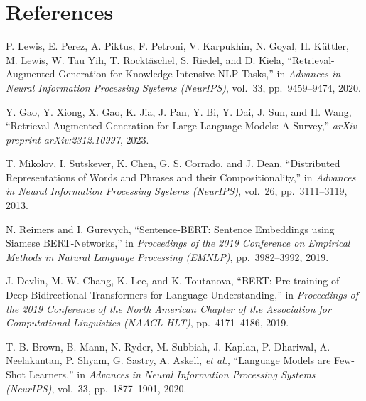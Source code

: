 
\chapter*{References}

\begin{flushleft}
\setlength{\parindent}{0pt}
\setlength{\parskip}{6pt}

\noindent[1]\hspace{6pt}
P. Lewis, E. Perez, A. Piktus, F. Petroni, V. Karpukhin, N. Goyal, H. Küttler,
M. Lewis, W. Tau Yih, T. Rocktäschel, S. Riedel, and D. Kiela,
``Retrieval-Augmented Generation for Knowledge-Intensive NLP Tasks,''
in \textit{Advances in Neural Information Processing Systems (NeurIPS)},
vol.~33, pp.~9459--9474, 2020.

\noindent[2]\hspace{6pt}
Y. Gao, Y. Xiong, X. Gao, K. Jia, J. Pan, Y. Bi, Y. Dai, J. Sun, and H. Wang,
``Retrieval-Augmented Generation for Large Language Models: A Survey,''
\textit{arXiv preprint arXiv:2312.10997}, 2023.

\noindent[3]\hspace{6pt}
T. Mikolov, I. Sutskever, K. Chen, G. S. Corrado, and J. Dean,
``Distributed Representations of Words and Phrases and their Compositionality,''
in \textit{Advances in Neural Information Processing Systems (NeurIPS)},
vol.~26, pp.~3111--3119, 2013.

\noindent[4]\hspace{6pt}
N. Reimers and I. Gurevych,
``Sentence-BERT: Sentence Embeddings using Siamese BERT-Networks,''
in \textit{Proceedings of the 2019 Conference on Empirical Methods in Natural
Language Processing (EMNLP)}, pp.~3982--3992, 2019.

\noindent[5]\hspace{6pt}
J. Devlin, M.-W. Chang, K. Lee, and K. Toutanova,
``BERT: Pre-training of Deep Bidirectional Transformers for Language
Understanding,''
in \textit{Proceedings of the 2019 Conference of the North American Chapter of
the Association for Computational Linguistics (NAACL-HLT)},
pp.~4171--4186, 2019.

\noindent[6]\hspace{6pt}
T. B. Brown, B. Mann, N. Ryder, M. Subbiah, J. Kaplan, P. Dhariwal,
A. Neelakantan, P. Shyam, G. Sastry, A. Askell, \textit{et al.},
``Language Models are Few-Shot Learners,''
in \textit{Advances in Neural Information Processing Systems (NeurIPS)},
vol.~33, pp.~1877--1901, 2020.


\end{flushleft}

